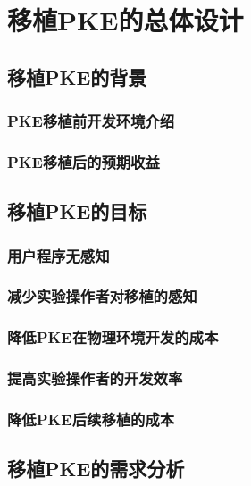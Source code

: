 
\chapter{移植PKE的总体设计}

\section{移植PKE的背景}

\subsection{PKE移植前开发环境介绍}

\subsection{PKE移植后的预期收益}

\section{移植PKE的目标}

\subsection{用户程序无感知}

\subsection{减少实验操作者对移植的感知}

\subsection{降低PKE在物理环境开发的成本}

\subsection{提高实验操作者的开发效率}

\subsection{降低PKE后续移植的成本}

\section{移植PKE的需求分析}

